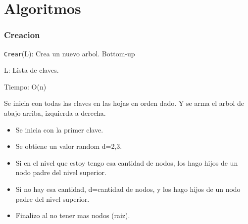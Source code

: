 \documentclass[10pt,handout]{beamer}
\begin{document}

\section{Algoritmos}
\begin{frame}
\frametitle{Creacion}

\texttt{Crear}(L): Crea un nuevo arbol. Bottom-up

  L: Lista de claves.

  Tiempo: O(n)

  Se inicia con todas las claves en las hojas en orden dado.
  Y se arma el arbol de abajo arriba, izquierda a derecha.

\begin{itemize}
  \item Se inicia con la primer clave.
  \item Se obtiene un valor random d={2,3}.
  \item Si en el nivel que estoy tengo esa cantidad de nodos, los hago hijos de
    un nodo padre del nivel superior.
  \item Si no hay esa cantidad, d=cantidad de nodos, y los hago hijos de un nodo
    padre del nivel superior.
  \item Finalizo al no tener mas nodos (raiz).
\end{itemize}

\end{frame}

\end{document}
